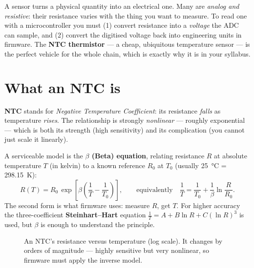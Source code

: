 \documentclass[11pt,a4paper,oneside]{book}
\begin{document}
A sensor turns a physical quantity into an electrical one. Many are
\emph{analog and resistive}: their resistance varies with the thing you want to
measure. To read one with a microcontroller you must (1) convert resistance into
a \emph{voltage} the ADC can sample, and (2) convert the digitised voltage back
into engineering units in firmware. The \textbf{NTC thermistor} --- a cheap,
ubiquitous temperature sensor --- is the perfect vehicle for the whole chain,
which is exactly why it is in your syllabus.

\section{What an NTC is}
\textbf{NTC} stands for \emph{Negative Temperature Coefficient}: its resistance
\emph{falls} as temperature \emph{rises}. The relationship is strongly
\emph{nonlinear} --- roughly exponential --- which is both its strength (high
sensitivity) and its complication (you cannot just scale it linearly).

A serviceable model is the \textbf{$\beta$ (Beta) equation}, relating resistance
$R$ at absolute temperature $T$ (in kelvin) to a known reference $R_0$ at $T_0$
(usually \qty{25}{\celsius} = \qty{298.15}{\kelvin}):
\[
   R(T) = R_0 \, \exp\!\left[\beta\left(\frac{1}{T} - \frac{1}{T_0}\right)\right],
   \qquad\text{equivalently}\quad
   \frac{1}{T} = \frac{1}{T_0} + \frac{1}{\beta}\ln\!\frac{R}{R_0}.
\]
The second form is what firmware uses: measure $R$, get $T$. For higher accuracy
the three-coefficient \textbf{Steinhart--Hart} equation
$\tfrac{1}{T}=A+B\ln R + C(\ln R)^3$ is used, but $\beta$ is enough to understand
the principle.

\begin{figure}[h]
\centering
{}
\caption{An NTC's resistance versus temperature (log scale). It changes by orders
of magnitude --- highly sensitive but very nonlinear, so firmware must apply the
inverse model.}
\label{fig:ntc-curve}
\end{figure}
\end{document}
